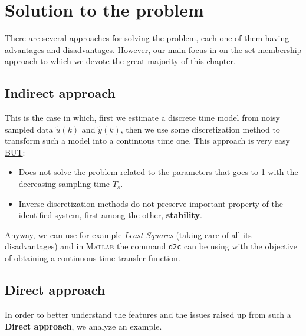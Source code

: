 \section{Solution to the problem}
There are several approaches for solving the problem, each one of them having advantages and disadvantages. However, our main focus in on the set-membership approach to which we devote the great majority of this chapter.

\subsection{Indirect approach}
This is the case in which, first we estimate a discrete time model from noisy sampled data $\tilde{u}(k)$ and $\tilde{y}(k)$, then we use some discretization method to transform such a model into a continuous time one. This approach is very easy \underline{BUT}:
\begin{itemize}
    \itemsep-0.2em
    \item Does not solve the problem related to the parameters that goes to 1 with the decreasing sampling time $T_s$.
    \item Inverse discretization methods do not preserve important property of the identified system, first among the other, \textbf{stability}.
\end{itemize}
Anyway, we can use for example \textit{Least Squares} (taking care of all its disadvantages) and in \textsc{Matlab} the command \texttt{d2c} can be using with the objective of obtaining a continuous time transfer function.

\subsection{Direct approach}
In order to better understand the features and the issues raised up from such a \textbf{Direct approach}, we analyze an example.\\

